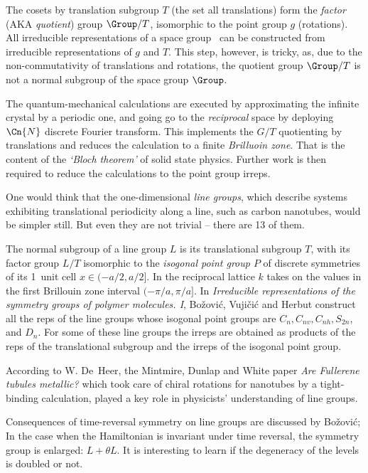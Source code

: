 The cosets by translation subgroup $T$ (the set all translations) form the
\emph{factor} (AKA \emph{quotient}) group $\Group/T$, isomorphic to the point
group $g$ (rotations).
All irreducible representations of a space group \Group\ can be constructed
from irreducible representations of $g$ and $T$.
This step, however, is tricky, as, due to the non-commutativity of
translations and rotations, the quotient group $\Group/T$ is not a normal
subgroup of the space group $\Group$.

The quantum-mechanical calculations are executed by approximating the
infinite crystal by a periodic one, and going go to the \emph{reciprocal}
space  by deploying $\Cn{N}$ discrete Fourier transform. This implements the
$G/T$ quotienting by translations and reduces the calculation to a finite
\emph{Brilluoin zone}. That is the content of the \emph{`Bloch theorem'} of
solid state physics. Further work is then required to reduce the
calculations to the point group irreps.

One would think that the one-dimensional \emph{line groups}, which describe
systems exhibiting translational periodicity along a line, such as carbon
nanotubes, would be simpler still. But even they are not trivial -- there are
13 of them.

The normal subgroup of a line group  $L$ is its translational subgroup $T$,
with its factor group $L/T$ isomorphic to the \emph{isogonal point group $P$}
of discrete symmetries of its 1\dmn\ unit cell $x\in(-a/2,a/2]$. In the
reciprocal lattice $k$ takes on the values in the first Brillouin zone
interval $(-\pi/a,\pi/a]$.
In {\em Irreducible representations of the symmetry groups of polymer
molecules. {I}}, Bo{\v{z}}ovi{\'c}, Vuji{\v{c}}i{\'c} and Herbut
construct all the reps of the line groups whose isogonal point groups are
$C_n , C_{nv}, C_{nh}, S_{2n}$, and $D_n$.
For some of these line groups the irreps are obtained as products of the reps
of the translational subgroup and the irreps of the isogonal point group.

According to W. De~Heer, the Mintmire, Dunlap and White paper {\em
Are Fullerene tubules metallic?} which took care of chiral rotations for
nanotubes by a tight-binding calculation, played a key role in physicists'
understanding of line groups.

Consequences of time-reversal symmetry on line groups are discussed by
Bo{\v{z}}ovi{\'c};
In the case when the Hamiltonian is invariant under time
reversal, the symmetry group is enlarged: $L+\theta L$. It is
interesting to learn if the degeneracy of the levels is doubled or not.

